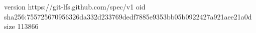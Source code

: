 version https://git-lfs.github.com/spec/v1
oid sha256:755725670956326da332d233769dedf7885e9353bb05b0922427a921aee21a0d
size 113866
